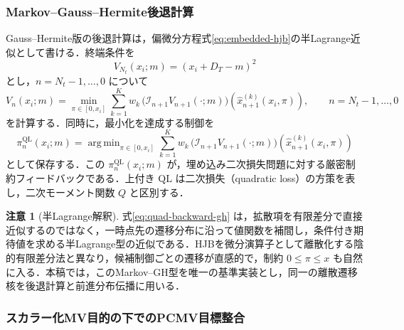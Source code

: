 \documentclass[10pt,a4paper]{article}
\theoremstyle{plain}
\theoremstyle{definition}
\newtheorem{remark}{注意}
\DeclareMathOperator*{\argmin}{arg\,min}
\begin{document}
\subsubsection{Markov--Gauss--Hermite後退計算}

Gauss--Hermite版の後退計算は，偏微分方程式\eqref{eq:embedded-hjb}の半Lagrange近似として書ける．終端条件を
\begin{equation}
  V_{N_t}(x_i;m)=(x_i+D_T-m)^2
  \label{eq:terminal-discrete-quad}
\end{equation}
とし，$n=N_t-1,\ldots,0$ について
\begin{equation}
  V_n(x_i;m)=
  \min_{\pi\in[0,x_i]}
  \sum_{k=1}^K w_k\,
  \bigl(\mathcal I_{n+1}V_{n+1}(\cdot;m)\bigr)
  \left(\widehat{x}_{n+1}^{(k)}(x_i,\pi)\right),
  \qquad n=N_t-1,\ldots,0
  \label{eq:quad-backward-gh}
\end{equation}
を計算する．同時に，最小化を達成する制御を
\begin{equation}
  \pi_n^{\mathrm{QL}}(x_i;m)=
  \argmin_{\pi\in[0,x_i]}
  \sum_{k=1}^K w_k\,
  \bigl(\mathcal I_{n+1}V_{n+1}(\cdot;m)\bigr)
  \left(\widehat{x}_{n+1}^{(k)}(x_i,\pi)\right)
  \label{eq:quad-feedback-gh}
\end{equation}
として保存する．この $\pi_n^{\mathrm{QL}}(x_i;m)$ が，埋め込み二次損失問題に対する厳密制約フィードバックである．上付き $\mathrm{QL}$ は二次損失（quadratic loss）の方策を表し，二次モーメント関数 $Q$ と区別する．

\begin{remark}[半Lagrange解釈]
式\eqref{eq:quad-backward-gh} は，拡散項を有限差分で直接近似するのではなく，一時点先の遷移分布に沿って値関数を補間し，条件付き期待値を求める半Lagrange型の近似である．HJBを微分演算子として離散化する陰的有限差分法と異なり，候補制御ごとの遷移が直感的で，制約 $0\leq\pi\leq x$ も自然に入る．本稿では，このMarkov--GH型を唯一の基準実装とし，同一の離散遷移核を後退計算と前進分布伝播に用いる．
\end{remark}

\subsubsection{スカラー化MV目的の下でのPCMV目標整合}
\end{document}
